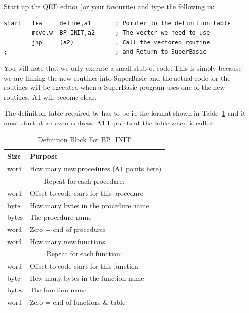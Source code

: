 Start up the QED editor (or your favourite) and type the following
    in:

\begin{lstlisting}[firstnumber=1,caption={Linking Extensions to SuperBasic},label={lst:LinkingSuperBasicExtensions}]
start   lea     define,a1       ; Pointer to the definition table
        move.w  BP_INIT,a2      ; The vector we need to use
        jmp     (a2)            ; Call the vectored routine
;                               ; and Return to SuperBasic
\end{lstlisting}

You will note that we only execute a small stub of code. This is
    simply because we are linking the new routines into SuperBasic and the
    actual code for the routines will be executed when a SuperBasic program
    uses one of the new routines. All will become clear.

The definition table required by  has to be in the format shown in Table~\ref{tab:DefinitionBlockForBPINIT} and it must start at an even address. A1.L points at the table when
     is called:

\begin{table}[htbp]
\centering
\begin{tabular}{l l}  %
\toprule
\textbf{Size} & \textbf{Purpose} \\
\midrule
%
word & How many new procedures (A1 points here)\\
\multicolumn{2}{c}{Repeat for each procedure:} \\
word  & Offset to code start for this procedure\\
byte  & How many bytes in the procedure name\\
bytes & The procedure name\\
word  & Zero = end of procedures\\
word  & How many new functions\\
\multicolumn{2}{c}{Repeat for each function:}\\
word  & Offset to code start for this function\\
byte  & How many bytes in the function name\\
bytes & The function name\\
word  & Zero = end of functions \& table\\
%
\bottomrule
\end{tabular}
\caption{Definition Block For BP\_INIT}
\label{tab:DefinitionBlockForBPINIT}
\end{table}

